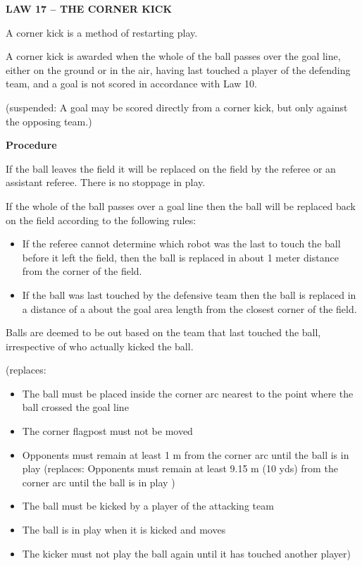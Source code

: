 \clearpage
\sffamily
{\bfseries\color[rgb]{0.4,0.4,0.4}
LAW 17 -- THE CORNER KICK}


\bigskip

A corner kick is a method of restarting play.

\bigskip

A corner kick is awarded when the whole of the ball passes over the goal
line, either on the ground or in the air, having last touched a player
of the defending team, and a goal is not scored in accordance with Law
10.

\bigskip

{\color[rgb]{0.4,0.4,0.4}(suspended: A goal may be scored directly
from a corner kick, but only against the opposing team.)}

\bigskip

{\bfseries Procedure}

\headlinebox

If the ball leaves the field it will be replaced on the field by the
referee or an assistant referee. There is no stoppage in play. 

If the whole of the ball passes over a goal line then the ball will be
replaced back on the field according to the following rules: 

\begin{itemize}
\item If the referee cannot determine which robot was the last to touch
the ball before it left the field, then the ball is replaced in about 1
meter distance from the corner of the field. 
\item If the ball was last touched by the defensive team then the ball
is replaced in a distance of a about the goal area length from the
closest corner of the field. 
\end{itemize}

Balls are deemed to be out based on the team that last touched the ball,
irrespective of who actually kicked the ball. 

\bigskip

{\color[rgb]{0.4,0.4,0.4}
(replaces: 

\begin{itemize}
\item The ball must be placed inside the corner arc nearest to the point where
the ball crossed the goal line 
\item The corner flagpost must not be moved
\item Opponents must remain at least 1 m from the corner arc until the ball is
in play (replaces: Opponents must remain at least 9.15 m (10 yds) from
the corner arc until the ball is in play )
\item The ball must be kicked by a player of the attacking team
\item The ball is in play when it is kicked and moves
\item The kicker must not play the ball again until it has touched another
player)
\end{itemize}
}

